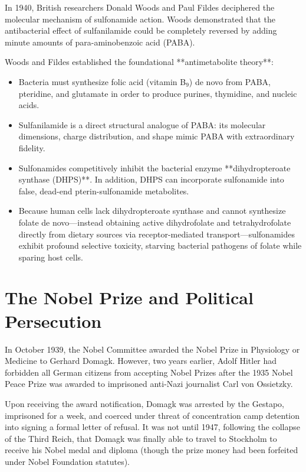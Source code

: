 In 1940, British researchers Donald Woods and Paul Fildes deciphered the molecular mechanism of sulfonamide action. Woods demonstrated that the antibacterial effect of sulfanilamide could be completely reversed by adding minute amounts of para-aminobenzoic acid (PABA).

Woods and Fildes established the foundational **antimetabolite theory**:
\begin{itemize}
    \item Bacteria must synthesize folic acid (vitamin B$_9$) de novo from PABA, pteridine, and glutamate in order to produce purines, thymidine, and nucleic acids.
    \item Sulfanilamide is a direct structural analogue of PABA: its molecular dimensions, charge distribution, and shape mimic PABA with extraordinary fidelity.
    \item Sulfonamides competitively inhibit the bacterial enzyme **dihydropteroate synthase (DHPS)**. In addition, DHPS can incorporate sulfonamide into false, dead-end pterin-sulfonamide metabolites.
    \item Because human cells lack dihydropteroate synthase and cannot synthesize folate de novo—instead obtaining active dihydrofolate and tetrahydrofolate directly from dietary sources via receptor-mediated transport—sulfonamides exhibit profound selective toxicity, starving bacterial pathogens of folate while sparing host cells.
\end{itemize}

\section{The Nobel Prize and Political Persecution}

In October 1939, the Nobel Committee awarded the Nobel Prize in Physiology or Medicine to Gerhard Domagk. However, two years earlier, Adolf Hitler had forbidden all German citizens from accepting Nobel Prizes after the 1935 Nobel Peace Prize was awarded to imprisoned anti-Nazi journalist Carl von Ossietzky.

Upon receiving the award notification, Domagk was arrested by the Gestapo, imprisoned for a week, and coerced under threat of concentration camp detention into signing a formal letter of refusal. It was not until 1947, following the collapse of the Third Reich, that Domagk was finally able to travel to Stockholm to receive his Nobel medal and diploma (though the prize money had been forfeited under Nobel Foundation statutes).

